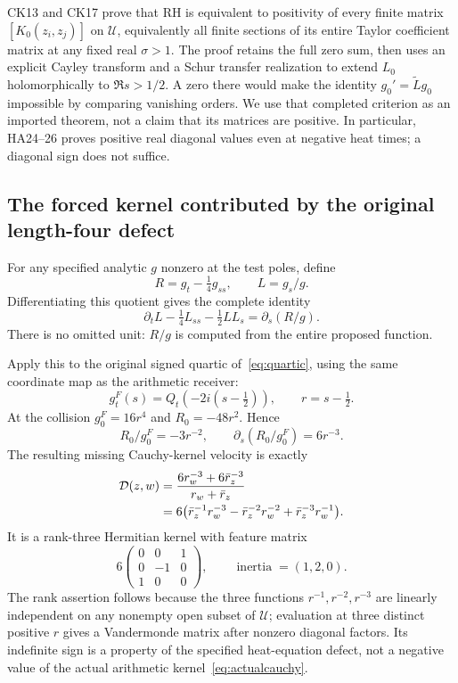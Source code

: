 \documentclass[11pt,a4paper]{article}
\theoremstyle{definition}\newtheorem{definition}[theorem]{Definition}\newtheorem{remark}[theorem]{Remark}
\begin{document}
CK13 and CK17 prove that RH is equivalent to positivity of every finite matrix $[K_0(z_i,z_j)]$ on $\mathcal U$, equivalently all finite sections of its entire Taylor coefficient matrix at any fixed real $\sigma>1$. The proof retains the full zero sum, then uses an explicit Cayley transform and a Schur transfer realization to extend $L_0$ holomorphically to $\Re s>1/2$. A zero there would make the identity $g_0'=\widetilde Lg_0$ impossible by comparing vanishing orders. We use that completed criterion as an imported theorem, not a claim that its matrices are positive. In particular, HA24--26 proves positive real diagonal values even at negative heat times; a diagonal sign does not suffice.

\subsection{The forced kernel contributed by the original length-four defect}
For any specified analytic $g$ nonzero at the test poles, define
\[
 R=g_t-\tfrac14g_{ss},\qquad L=g_s/g.
\]
Differentiating this quotient gives the complete identity
\begin{equation}
 \partial_tL-\tfrac14L_{ss}-\tfrac12LL_s
     =\partial_s(R/g).                                  \label{eq:forcedburgers}
\end{equation}
There is no omitted unit: $R/g$ is computed from the entire proposed function.

Apply this to the original signed quartic of~\eqref{eq:quartic}, using the same coordinate map as the arithmetic receiver:
\[
 g_t^F(s)=Q_t(-2i(s-\tfrac12)),\qquad r=s-\tfrac12.
\]
At the collision $g_0^F=16r^4$ and $R_0=-48r^2$. Hence
\begin{equation}
 R_0/g_0^F=-3r^{-2},\qquad
 \partial_s(R_0/g_0^F)=6r^{-3}.                         \label{eq:cauchyforcedres}
\end{equation}
The resulting missing Cauchy-kernel velocity is exactly
\begin{align}
 \mathcal D(z,w)
 &=\frac{6r_w^{-3}+6\bar r_z^{-3}}{r_w+\bar r_z}\notag\\
 &=6\bigl(\bar r_z^{-1}r_w^{-3}
       -\bar r_z^{-2}r_w^{-2}
       +\bar r_z^{-3}r_w^{-1}\bigr).                    \label{eq:rank3defect}
\end{align}
It is a rank-three Hermitian kernel with feature matrix
\[
 6\begin{pmatrix}0&0&1\\0&-1&0\\1&0&0\end{pmatrix},
 \qquad \operatorname{inertia}=(1,2,0).
\]
The rank assertion follows because the three functions $r^{-1},r^{-2},r^{-3}$ are linearly independent on any nonempty open subset of $\mathcal U$; evaluation at three distinct positive $r$ gives a Vandermonde matrix after nonzero diagonal factors. Its indefinite sign is a property of the specified heat-equation defect, not a negative value of the actual arithmetic kernel~\eqref{eq:actualcauchy}.
\end{document}
